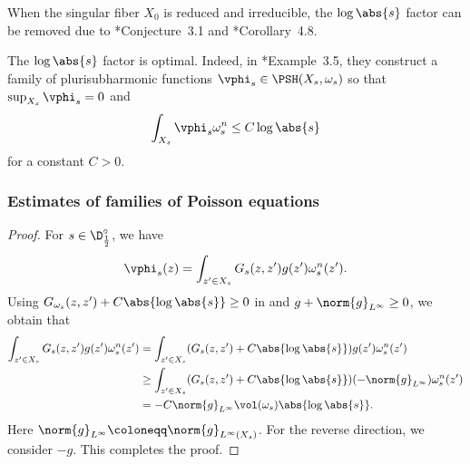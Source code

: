 \documentclass[12pt]{amsart}
\begin{document}
\begin{remark}
    When the singular fiber $X_0$ is reduced and irreducible,
    the $\log\abs{s}$ factor can be removed due to 
    \cite{DNGG2022}*{Conjecture~3.1} and \cite{Ou2022}*{Corollary~4.8}.
\end{remark}

\begin{remark}
    The $\log\abs{s}$ factor is optimal. Indeed, in \cite{DNGG2022}*{Example~3.5}, they construct a family of plurisubharmonic
    functions $\vphi_s \in \PSH(X_s, \omega_s)$ so that $\sup_{X_s} \vphi_s = 0$ and 
    \[
    \int_{X_s} \vphi_s \omega_s^n \leq C \log\abs{s}
    \]
    for a constant $C > 0$.
\end{remark}

\subsubsection{Estimates of families of Poisson equations}

\begin{proof}
    For $s \in \D^{\circ}_{\frac{1}{2}}$, we have 
    \[
    \vphi_s(z) = \int_{z' \in X_s} G_s(z, z') g(z')
    \omega_s^n(z').
    \]
    Using $G_{\omega_s}(z, z') + C \abs{\log \abs{s}} \geq 0$ in  and 
    $g + \norm{g}_{L^\infty} \geq 0$, we obtain that 
    \begin{align*}
        \int_{z' \in X_s} G_s(z, z') g(z')
    \omega_s^n(z') &= \int_{z' \in X_s} (G_s(z, z') + C \abs{\log \abs{s}}) g(z')
    \omega_s^n(z')\\
    &\geq \int_{z' \in X_s} (G_s(z, z') + C \abs{\log \abs{s}}) (-\norm{g}_{L^\infty})
    \omega_s^n(z')\\
    &= -C \norm{g}_{L^\infty} \vol(\omega_s)\abs{\log \abs{s}}.
    \end{align*}
    Here $\norm{g}_{L^\infty} \coloneqq 
    \norm{g}_{L^\infty(X_s)}$. For the reverse direction, we consider $-g$. This completes the 
    proof.
\end{proof}
\end{document}
